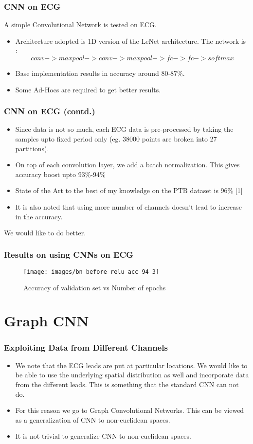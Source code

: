 \documentclass{beamer}
\begin{document}
\begin{frame}
  \frametitle{CNN on ECG}
  A simple Convolutional Network is tested on ECG.
  \begin{itemize}
  \item Architecture adopted is 1D version of the LeNet architecture. The network is :
    $$conv -> max pool -> conv -> max pool -> fc -> fc -> softmax$$
  \item Base implementation results in accuracy around 80-87\%.
  \item Some Ad-Hocs are required to get better results.
  \end{itemize}
\end{frame}

\begin{frame}
  \frametitle{CNN on ECG (contd.)}
  \begin{itemize}
  \item Since data is not so much, each ECG data is pre-processed by taking the samples upto fixed period only (eg. 38000 points are broken into 27 partitions).
  \item On top of each convolution layer, we add a batch normalization. This gives accuracy boost upto 93\%-94\%
  \item State of the Art to the best of my knowledge on the PTB dataset is 96\% [1]
  \item It is also noted that using more number of channels doesn't lead to increase in the accuracy.
  \end{itemize}
  We would like to do better.
\end{frame}

\begin{frame}
  \frametitle{Results on using CNNs on ECG}
  \begin{figure}[H]
    \centering
    \texttt{[image: images/bn\_before\_relu\_acc\_94\_3]}
    \caption{Accuracy of validation set vs Number of epochs}
    \label{fig:1}
  \end{figure}
\end{frame}

\section{Graph CNN}
\begin{frame}
  \frametitle{Exploiting Data from Different Channels}
  \begin{itemize}
  \item We note that the ECG leads are put at particular locations. We would like to be able to use the underlying spatial distribution as well and incorporate data from the different leads. This is something that the standard CNN can not do.
  \item For this reason we go to Graph Convolutional Networks. This can be viewed as a generalization of CNN to non-euclidean spaces.
  \item It is not trivial to generalize CNN to non-euclidean spaces.
  \end{itemize}
\end{frame}
\end{document}
